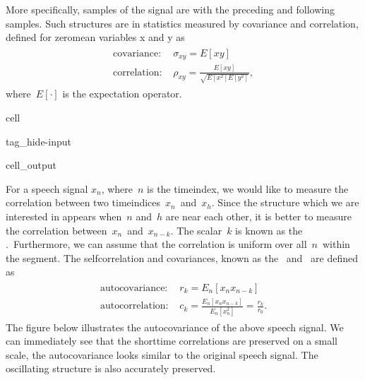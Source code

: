 \documentclass[letterpaper,10pt,english]{jupyterBook}
\begin{document}
\sphinxAtStartPar
More specifically, samples of the signal are  with the
preceding and following samples. Such structures are in statistics
measured by covariance and correlation, defined for zero\sphinxhyphen{}mean variables
x and y as
\begin{equation*}
\begin{split} \begin{split} \text{covariance: } & \sigma_{xy} = E[xy] \\
\text{correlation: } & \rho_{xy} =
\frac{E[xy]}{\sqrt{E[x^2]E[y^2]}}, \end{split} \end{split}
\end{equation*}
\sphinxAtStartPar
where \(E[ \cdot ]\) is the expectation operator.

\begin{sphinxuseclass}{cell}
\begin{sphinxuseclass}{tag_hide-input}\begin{sphinxVerbatimOutput}

\begin{sphinxuseclass}{cell_output}
\noindent{}

\end{sphinxuseclass}\end{sphinxVerbatimOutput}

\end{sphinxuseclass}
\end{sphinxuseclass}
\sphinxAtStartPar
For a speech signal \(x_{n}\), where \(n\) is the time\sphinxhyphen{}index, we
would like to measure the correlation between two
time\sphinxhyphen{}indices \(x_{n}\) and \(x_{h}\). Since the structure
which we are interested in appears when \(n\) and \(h\) are near each other,
it is better to measure the correlation
between \(x_{n}\) and \(x_{n-k}\). The scalar \(k\) is known
as the . Furthermore, we can assume that the correlation is uniform
over all \(n\) within the segment. The self\sphinxhyphen{}correlation and \sphinxhyphen{}covariances,
known as the  and  are defined as
\begin{equation*}
\begin{split} \begin{split} \text{autocovariance: } & r_{k} =
E_n[x_nx_{n-k}] \\ \text{autocorrelation: } & c_{k} =
\frac{E_n[x_nx_{n-k}]}{E_n[x_n^2]} = \frac{r_k}{r_0}.
\end{split} \end{split}
\end{equation*}
\sphinxAtStartPar
The figure below illustrates the autocovariance of the above
speech signal. We can immediately see that the short\sphinxhyphen{}time correlations
are preserved \sphinxhyphen{} on a small scale, the autocovariance looks similar to
the original speech signal. The oscillating structure is also accurately
preserved.
\end{document}
